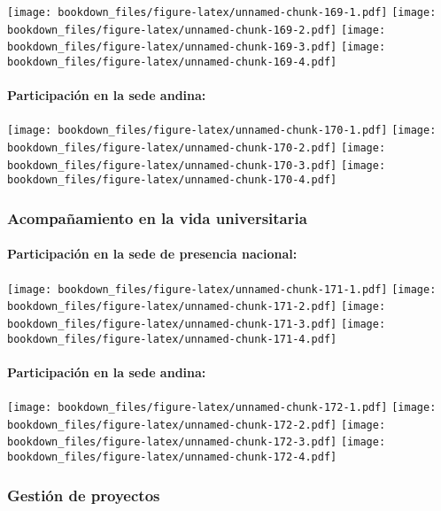 \documentclass[]{article}
\let\oldparagraph\paragraph
\renewcommand{\paragraph}[1]{\oldparagraph{#1}\mbox{}}
\theoremstyle{definition}
\theoremstyle{definition}
\theoremstyle{definition}
\theoremstyle{remark}
\begin{document}
\texttt{[image: bookdown\_files/figure-latex/unnamed-chunk-169-1.pdf]}
\texttt{[image: bookdown\_files/figure-latex/unnamed-chunk-169-2.pdf]}
\texttt{[image: bookdown\_files/figure-latex/unnamed-chunk-169-3.pdf]}
\texttt{[image: bookdown\_files/figure-latex/unnamed-chunk-169-4.pdf]}

\paragraph{Participación en la sede
andina:}\label{participacion-en-la-sede-andina-1}

\texttt{[image: bookdown\_files/figure-latex/unnamed-chunk-170-1.pdf]}
\texttt{[image: bookdown\_files/figure-latex/unnamed-chunk-170-2.pdf]}
\texttt{[image: bookdown\_files/figure-latex/unnamed-chunk-170-3.pdf]}
\texttt{[image: bookdown\_files/figure-latex/unnamed-chunk-170-4.pdf]}

\subsubsection{Acompañamiento en la vida
universitaria}\label{acompanamiento-en-la-vida-universitaria-1}

\paragraph{Participación en la sede de presencia
nacional:}\label{participacion-en-la-sede-de-presencia-nacional-2}

\texttt{[image: bookdown\_files/figure-latex/unnamed-chunk-171-1.pdf]}
\texttt{[image: bookdown\_files/figure-latex/unnamed-chunk-171-2.pdf]}
\texttt{[image: bookdown\_files/figure-latex/unnamed-chunk-171-3.pdf]}
\texttt{[image: bookdown\_files/figure-latex/unnamed-chunk-171-4.pdf]}

\paragraph{Participación en la sede
andina:}\label{participacion-en-la-sede-andina-2}

\texttt{[image: bookdown\_files/figure-latex/unnamed-chunk-172-1.pdf]}
\texttt{[image: bookdown\_files/figure-latex/unnamed-chunk-172-2.pdf]}
\texttt{[image: bookdown\_files/figure-latex/unnamed-chunk-172-3.pdf]}
\texttt{[image: bookdown\_files/figure-latex/unnamed-chunk-172-4.pdf]}

\subsubsection{Gestión de proyectos}\label{gestion-de-proyectos-1}
\end{document}
